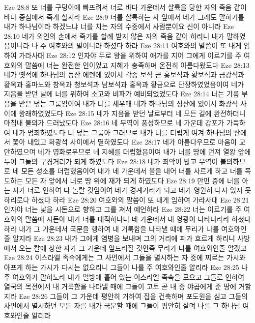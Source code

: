 Eze 28:8  또 너를 구덩이에 빠뜨려서 너로 바다 가운데서 살륙을 당한 자의 죽음 같이 바다 중심에서 죽게 할지라
Eze 28:9  너를 살륙하는 자 앞에서 네가 그래도 말하기를 내가 하나님이라 하겠느냐 너를 치는 자의 수중에서 사람뿐이요 신이 아니라
Eze 28:10  네가 외인의 손에서 죽기를 할례 받지 않은 자의 죽음 같이 하리니 내가 말하였음이니라 나 주 여호와의 말이니라 하셨다 하라
Eze 28:11  여호와의 말씀이 또 내게 임하여 가라사대
Eze 28:12  인자야 두로 왕을 위하여 애가를 지어 그에게 이르기를 주 여호와의 말씀에 너는 완전한 인이었고 지혜가 충족하며 온전히 아름다왔도다
Eze 28:13  네가 옛적에 하나님의 동산 에덴에 있어서 각종 보석 곧 홍보석과 황보석과 금강석과 황옥과 홍마노와 창옥과 청보석과 남보석과 홍옥과 황금으로 단장하였었음이여 네가 지음을 받던 날에 너를 위하여 소고와 비파가 예비되었었도다
Eze 28:14  너는 기름 부음을 받은 덮는 그룹임이여 내가 너를 세우매 네가 하나님의 성산에 있어서 화광석 사이에 왕래하였었도다
Eze 28:15  네가 지음을 받던 날로부터 네 모든 길에 완전하더니 마침내 불의가 드러났도다
Eze 28:16  네 무역이 풍성하므로 네 가운데 강포가 가득하여 네가 범죄하였도다 너 덮는 그룹아 그러므로 내가 너를 더럽게 여겨 하나님의 산에서 쫓아 내었고 화광석 사이에서 멸하였도다
Eze 28:17  네가 아름다우므로 마음이 교만하였으며 네가 영화로우므로 네 지혜를 더럽혔음이여 내가 너를 땅에 던져 열왕 앞에 두어 그들의 구경거리가 되게 하였도다
Eze 28:18  네가 죄악이 많고 무역이 불의하므로 네 모든 성소를 더럽혔음이여 내가 네 가운데서 불을 내어 너를 사르게 하고 너를 목도하는 모든 자 앞에서 너로 땅 위에 재가 되게 하였도다
Eze 28:19  만민 중에 너를 아는 자가 너로 인하여 다 놀랄 것임이여 네가 경계거리가 되고 네가 영원히 다시 있지 못하리로다 하셨다 하라
Eze 28:20  여호와의 말씀이 또 내게 임하여 가라사대
Eze 28:21  인자야 너는 낯을 시돈으로 향하고 그를 쳐서 예언하라
Eze 28:22  너는 이르기를 주 여호와의 말씀에 시돈아 내가 너를 대적하나니 네 가운데서 내 영광이 나타나리라 하셨다 하라 내가 그 가운데서 국문을 행하여 내 거룩함을 나타낼 때에 무리가 나를 여호와인줄 알지라
Eze 28:23  내가 그에게 염병을 보내며 그의 거리에 피가 흐르게 하리니 사방에서 오는 칼에 상한 자가 그 가운데 엎드러질 것인즉 무리가 나를 여호와인줄 알겠고
Eze 28:24  이스라엘 족속에게는 그 사면에서 그들을 멸시하는 자 중에 찌르는 가시와 아프게 하는 가시가 다시는 없으리니 그들이 나를 주 여호와인줄 알리라
Eze 28:25  나 주 여호와가 말하노라 내가 열방에 흩어 있는 이스라엘 족속을 모으고 그들로 인하여 열국의 목전에서 내 거룩함을 나타낼 때에 그들이 고토 곧 내 종 야곱에게 준 땅에 거할지라
Eze 28:26  그들이 그 가운데 평안히 거하여 집을 건축하며 포도원을 심고 그들의 사면에서 멸시하던 모든 자를 내가 국문할 때에 그들이 평안히 살며 나를 그 하나님 여호와인줄 알리라
